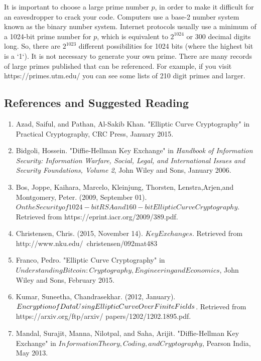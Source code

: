 It is important to choose a large prime number $p$, in order to make it difficult for an eavesdropper to crack your code.  Computers use a base-2 number system known as the binary number system.  Internet protocols usually use a minimum of a 1024-bit prime number for $p$, which is equivalent to $2^{1024}$ or 300 decimal digits long.  So, there are $2^{1023}$ different possibilities for 1024 bits (where the highest bit is a `1`). It is not necessary to generate your own prime.  There are many records of large primes published that can be referenced. For example, if you visit https://primes.utm.edu/ you can see some lists of 210 digit primes and larger.

\newpage  

\subsection{References and Suggested Reading} 
\begin{enumerate}[(1)]

\item
Azad, Saiful, and Pathan, Al-Sakib Khan. "Elliptic Curve Cryptography" in Practical Cryptography, CRC Press, January 2015.

\item 
Bidgoli, Hossein. "Diffie-Hellman Key Exchange" in \textit{Handbook of Information \newline
Security: Information Warfare, Social, Legal, and International Issues and \newline
Security Foundations, Volume 2}, John Wiley and Sons, January 2006.

\item 
Bos, Joppe, Kaihara, Marcelo, Kleinjung, Thorsten, Lenstra,Arjen,and Montgomery, Peter. (2009, September 01). $On the Security of 1024-bit RSA and 160-bit Elliptic Curve Cryptography$. Retrieved from https://eprint.iacr.org/2009/389.pdf.

\item 
Christensen, Chris. (2015, November 14). $Key Exchanges$. Retrieved from http://www.nku.edu/~christensen/092mat483%

\item
Franco, Pedro. "Elliptic Curve Cryptography" in $Understanding Bitcoin: Cryptography, Engineering and Economics$, John Wiley and Sons, February 2015.

\item 
Kumar, Suneetha, Chandrasekhar. (2012, January). $Encryption of Data  Using \newline
Elliptic Curve Over Finite Fields$. Retrieved from https://arxiv.org/ftp/arxiv/ \newline
papers/1202/1202.1895.pdf.

\item 
Mandal, Surajit, Manna, Nilotpal, and Saha, Arijit. "Diffie-Hellman \newline
Key Exchange" in $Information Theory, Coding, and Cryptography$, Pearson India, May 2013.





\end{enumerate}